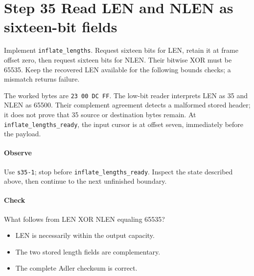\section{Step 35 Read LEN and NLEN as sixteen-bit fields}\label{png-inflate-s35}
Implement \texttt{inflate\_lengths}. Request sixteen bits for LEN, retain it at frame offset zero, then request sixteen bits for NLEN. Their bitwise XOR must be 65535. Keep the recovered LEN available for the following bounds checks; a mismatch returns failure.

The worked bytes are \texttt{23 00 DC FF}. The low-bit reader interprets LEN as 35 and NLEN as 65500. Their complement agreement detects a malformed stored header; it does not prove that 35 source or destination bytes remain. At \texttt{inflate\_lengths\_ready}, the input cursor is at offset seven, immediately before the payload.

\paragraph{Observe} Use \texttt{s35-1}; stop before \texttt{inflate\_lengths\_ready}. Inspect the state described above, then continue to the next unfinished boundary.

\paragraph{Check} What follows from LEN XOR NLEN equaling 65535?
\begin{itemize}
  \item[A.] LEN is necessarily within the output capacity.
  \item[B.] The two stored length fields are complementary.
  \item[C.] The complete Adler checksum is correct.
\end{itemize}
